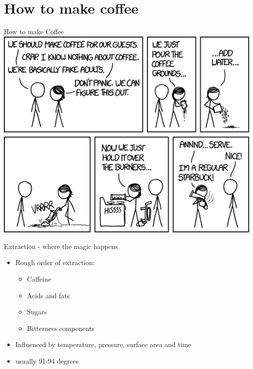 \documentclass[10pt,graphics,aspectratio=169,table]{beamer}
\begin{document}
\section{How to make coffee}

\begin{frame}{How to make Coffee}
    \includegraphics[scale=0.483]{img/coffeeXkcd.png} \cite{xkcd}
\end{frame}

\begin{frame}{Extraction - where the magic happens}
 \begin{itemize}
    \item Rough order of extraction:
    \begin{itemize}
      \item Caffeine
      \item Acids and fats
      \item Sugars
      \item Bitterness components
    \end{itemize}
    \item Influenced by temperature, pressure, surface area and time
    \item usually 91-94 degrees
 \end{itemize}
\end{frame}
\end{document}
